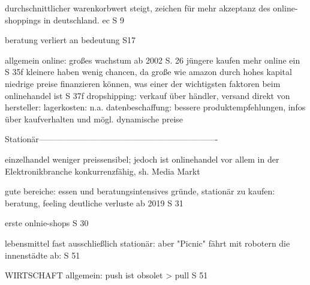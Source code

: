         durchschnittlicher warenkorbwert steigt, zeichen für mehr akzeptanz des online-shoppings in deutschland. ec S 9
        
        beratung verliert an bedeutung S17
        
    
        
        allgemein online: großes wachstum ab 2002 S. 26
            jüngere kaufen mehr online ein S 35f
            kleinere haben wenig chancen, da große wie amazon durch hohes kapital niedrige preise finanzieren können, was einer der wichtigsten faktoren beim onlinehandel ist S 37f
            dropshipping: verkauf über händler, versand direkt von hersteller: lagerkosten: n.a.
            datenbeschaffung: bessere produktempfehlungen, infos über kaufverhalten und mögl. dynamische preise
            
    
        
        Stationär----------------------------------------------------------------


            einzelhandel weniger preissensibel; jedoch ist onlinehandel vor allem in der Elektronikbranche konkurrenzfähig, sh. Media Markt\cite[S. 21f]{Graf}

        gute bereiche: essen und beratungsintensives
        gründe, stationär zu kaufen: beratung, feeling
            deutliche verluste ab 2019 S 31
            
            erste onlnie-shops S 30
            
            lebensmittel fast ausschließlich stationär: aber "Picnic" fährt mit robotern die innenstädte ab: S 51


            
\fi

\iffalse WIRTSCHAFT
allgemein:
        push ist obsolet > pull S 51
        
